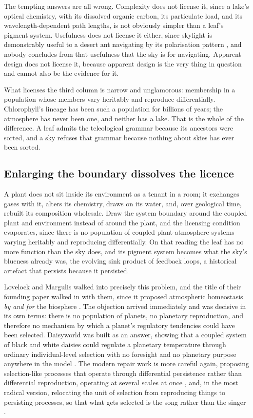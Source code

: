 The tempting answers are all wrong. Complexity does not license it, since a lake's optical chemistry, with its dissolved organic carbon, its particulate load, and its wavelength-dependent path lengths, is not obviously simpler than a leaf's pigment system. Usefulness does not license it either, since skylight is demonstrably useful to a desert ant navigating by its polarisation pattern \citep{wehner2006}, and nobody concludes from that usefulness that the sky is for navigating. Apparent design does not license it, because apparent design is the very thing in question and cannot also be the evidence for it.

What licenses the third column is narrow and unglamorous: membership in a population whose members vary heritably and reproduce differentially. Chlorophyll's lineage has been such a population for billions of years; the atmosphere has never been one, and neither has a lake. That is the whole of the difference. A leaf admits the teleological grammar because its ancestors were sorted, and a sky refuses that grammar because nothing about skies has ever been sorted.

\subsection{Enlarging the boundary dissolves the licence}

A plant does not sit inside its environment as a tenant in a room; it exchanges gases with it, alters its chemistry, draws on its water, and, over geological time, rebuilt its composition wholesale. Draw the system boundary around the coupled plant and environment instead of around the plant, and the licensing condition evaporates, since there is no population of coupled plant-atmosphere systems varying heritably and reproducing differentially. On that reading the leaf has no more function than the sky does, and its pigment system becomes what the sky's blueness already was, the evolving sink product of feedback loops, a historical artefact that persists because it persisted.

Lovelock and Margulis walked into precisely this problem, and the title of their founding paper walked in with them, since it proposed atmospheric homeostasis \emph{by and for} the biosphere \citep{lovelock1974}. The objection arrived immediately and was decisive in its own terms: there is no population of planets, no planetary reproduction, and therefore no mechanism by which a planet's regulatory tendencies could have been selected. Daisyworld was built as an answer, showing that a coupled system of black and white daisies could regulate a planetary temperature through ordinary individual-level selection with no foresight and no planetary purpose anywhere in the model \citep{watson1983}. The modern repair work is more careful again, proposing selection-like processes that operate through differential persistence rather than differential reproduction, operating at several scales at once \citep{lenton2018}, and, in the most radical version, relocating the unit of selection from reproducing things to persisting processes, so that what gets selected is the song rather than the singer \citep{doolittle2017,doolittle2018}.

